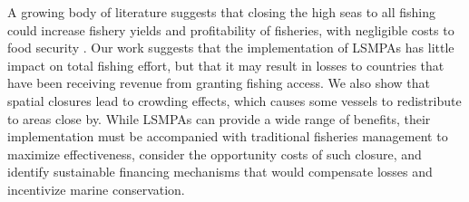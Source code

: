 \documentclass[9p,twocolumn,twoside,lineno]{pnas-new}
\begin{document}
A growing body of literature suggests that closing the high seas to all fishing could increase fishery yields and profitability of fisheries, with negligible costs to food security \citep{white_2014,sumaila_2015,sala_2018a,schiller_2018}. Our work suggests that the implementation of LSMPAs has little impact on total fishing effort, but that it may result in losses to countries that have been receiving revenue from granting fishing access. We also show that spatial closures lead to crowding effects, which causes some vessels to redistribute to areas close by. While LSMPAs can provide a wide range of benefits, their implementation must be accompanied with traditional fisheries management to maximize effectiveness, consider the opportunity costs of such closure, and identify sustainable financing mechanisms that would compensate losses and incentivize marine conservation.
\end{document}
